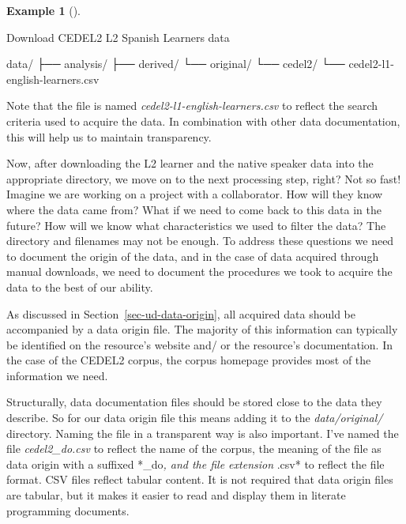 \documentclass[
  letterpaper,
  DIV=11,
  numbers=noendperiod]{scrreprt}
\newenvironment{Shaded}{\begin{snugshade}}{\end{snugshade}}
\newcommand{\ExtensionTok}[1]{\textcolor[rgb]{0.00,0.00,0.00}{#1}}
\newcommand{\NormalTok}[1]{\textcolor[rgb]{0.00,0.00,0.00}{#1}}
\theoremstyle{definition}
\newtheorem{example}{Example}[chapter]
\theoremstyle{remark}
\begin{document}
\begin{example}[]\protect\hypertarget{exm-ad-cedel2-learners-download}{}\label{exm-ad-cedel2-learners-download}

Download CEDEL2 L2 Spanish Learners data

\begin{Shaded}
\begin{Highlighting}[]
\ExtensionTok{data/}
\ExtensionTok{├──}\NormalTok{ analysis/}
\ExtensionTok{├──}\NormalTok{ derived/}
\ExtensionTok{└──}\NormalTok{ original/}
    \ExtensionTok{└──}\NormalTok{ cedel2/}
    \ExtensionTok{└──}\NormalTok{ cedel2{-}l1{-}english{-}learners.csv}
\end{Highlighting}
\end{Shaded}

\end{example}

Note that the file is named \emph{cedel2-l1-english-learners.csv} to
reflect the search criteria used to acquire the data. In combination
with other data documentation, this will help us to maintain
transparency.

Now, after downloading the L2 learner and the native speaker data into
the appropriate directory, we move on to the next processing step,
right? Not so fast! Imagine we are working on a project with a
collaborator. How will they know where the data came from? What if we
need to come back to this data in the future? How will we know what
characteristics we used to filter the data? The directory and filenames
may not be enough. To address these questions we need to document the
origin of the data, and in the case of data acquired through manual
downloads, we need to document the procedures we took to acquire the
data to the best of our ability.

As discussed in Section~\ref{sec-ud-data-origin}, all acquired data
should be accompanied by a data origin file. The majority of this
information can typically be identified on the resource's website and/
or the resource's documentation. In the case of the CEDEL2 corpus, the
corpus homepage provides most of the information we need.

Structurally, data documentation files should be stored close to the
data they describe. So for our data origin file this means adding it to
the \emph{data/original/} directory. Naming the file in a transparent
way is also important. I've named the file \emph{cedel2\_do.csv} to
reflect the name of the corpus, the meaning of the file as data origin
with a suffixed *\_do\emph{, and the file extension }.csv* to reflect
the file format. CSV files reflect tabular content. It is not required
that data origin files are tabular, but it makes it easier to read and
display them in literate programming documents.
\end{document}
